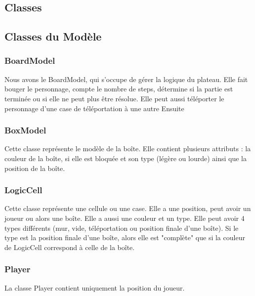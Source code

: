 \documentclass[utf8]{article}
\begin{document}
\begin{large}
\par


\section{Classes}
\par
\indent

\par
\subsection{Classes du Modèle}

\subsubsection{BoardModel}
\par
\indent
Nous avons le BoardModel, qui s'occupe de gérer la logique du plateau. Elle fait
bouger le personnage, compte le nombre de steps, détermine si la partie est
terminée ou si elle ne peut plus être résolue. Elle peut aussi téléporter le
personnage d'une case de téléportation à une autre Ensuite
\par
\subsubsection{BoxModel}
\par
\indent
Cette classe représente le modèle de la boîte. Elle contient plusieurs attributs
: la couleur de la boîte, si elle est bloquée et son type (légère ou lourde)
ainsi que la position de la boîte.
\par
\subsubsection{LogicCell}
\par
\indent
Cette classe représente une cellule ou une case. Elle a une position, peut avoir
un joueur ou alors une boîte. Elle a aussi une couleur et un type. Elle peut
avoir 4 types différents (mur, vide, téléportation ou position finale d'une
boîte). Si le type est la position finale d'une boîte, alors elle est "complète"
que si la couleur de LogicCell correspond à celle de la boîte.
\par
\subsubsection{Player}
\par
\indent
La classe Player contient uniquement la position du joueur.
\par

\end{large}
\end{document}
